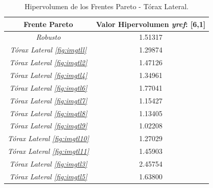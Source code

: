 \begin{table}[H]
\centering
\caption{Hipervolumen de los Frentes Pareto - Tórax Lateral.}
\begin{tabular}{|c|c|}
\hline
Frente Pareto & Valor  Hipervolumen {\it yref}: [6,1] \\
\hline \hline 
\it{Robusto} &  1.51317\\ \hline
\it{Tórax Lateral \ref{fig:imgtll}} & 1.29874 \\ \hline
\it{Tórax Lateral \ref{fig:imgtl2}} & 1.47126 \\ \hline
\it{Tórax Lateral \ref{fig:imgtl4}} & 1.34961 \\ \hline
\it{Tórax Lateral \ref{fig:imgtl6}} & 1.77041 \\ \hline
\it{Tórax Lateral \ref{fig:imgtl7}} & 1.15427 \\ \hline
\it{Tórax Lateral \ref{fig:imgtl8}} & 1.13405 \\ \hline
\it{Tórax Lateral \ref{fig:imgtl9}} & 1.02208 \\ \hline
\it{Tórax Lateral \ref{fig:imgtl10}} & 1.27029 \\ \hline
\it{Tórax Lateral \ref{fig:imgtl11}} & 1.45903 \\ \hline
\it{Tórax Lateral \ref{fig:imgtl3}} & 2.45754 \\ \hline
\it{Tórax Lateral \ref{fig:imgtl5}} & 1.63800 \\ \hline

\end{tabular}
\label{tabla:hipervolumen-lateral}
\end{table}















